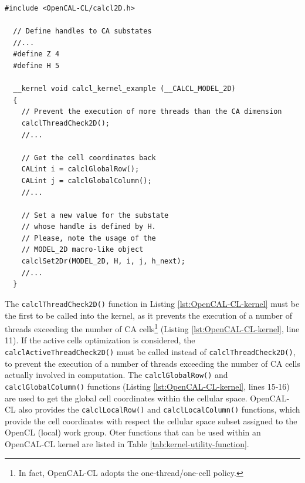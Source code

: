 \begin{lstlisting}[float,floatplacement=H, label=lst:OpenCAL-CL-kernel, caption=Example of OpenCAL-CL kernel.] 
  #include <OpenCAL-CL/calcl2D.h>

  // Define handles to CA substates
  //...
  #define Z 4
  #define H 5

  __kernel void calcl_kernel_example (__CALCL_MODEL_2D)
  {
    // Prevent the execution of more threads than the CA dimension
    calclThreadCheck2D();
    //...

    // Get the cell coordinates back
    CALint i = calclGlobalRow();
    CALint j = calclGlobalColumn();
    //...

    // Set a new value for the substate
    // whose handle is defined by H.
    // Please, note the usage of the
    // MODEL_2D macro-like object
    calclSet2Dr(MODEL_2D, H, i, j, h_next);
    //...
  }
\end{lstlisting}

The \verb'calclThreadCheck2D()' function in Listing
\ref{lst:OpenCAL-CL-kernel} must be the first to be called into the
kernel, as it prevents the execution of a number of threads exceeding
the number of CA cells\footnote{In fact, OpenCAL-CL adopts the
  one-thread/one-cell policy.} (Listing \ref{lst:OpenCAL-CL-kernel},
line 11). If the active cells optimization is considered, the
\verb'calclActiveThreadCheck2D()' must be called instead of
\verb'calclThreadCheck2D()', to prevent the execution of a number of
threads exceeding the number of CA cells actually involved in
computation. The \verb'calclGlobalRow()' and
\verb'calclGlobalColumn()' functions (Listing
\ref{lst:OpenCAL-CL-kernel}, lines 15-16) are used to get the global
cell coordinates within the cellular space. OpenCAL-CL also provides
the \verb'calclLocalRow()' and \verb'calclLocalColumn()' functions,
which provide the cell coordinates with respect the cellular space
subset assigned to the OpenCL (local) work group. Oter functions that
can be used within an OpenCAL-CL kernel are listed in Table
\ref{tab:kernel-utility-function}.


